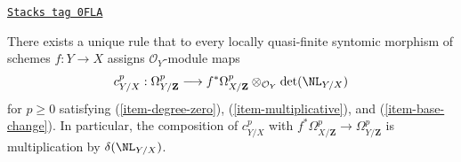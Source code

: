 \begin{lemma}
\label{derham-lemma-Garel-upstairs}
\href{https://stacks.math.columbia.edu/tag/0FLA}{\texttt{Stacks tag 0FLA}}

There exists a unique rule that to every locally quasi-finite syntomic
morphism of schemes $f : Y \to X$ assigns $\mathcal{O}_Y$-module maps
$$
c^p_{Y/X} :
\Omega^p_{Y/\mathbf{Z}}
\longrightarrow
f^*\Omega^p_{X/\mathbf{Z}} \otimes_{\mathcal{O}_Y} \det(\NL_{Y/X})
$$
for $p \geq 0$ satisfying (\ref{item-degree-zero}), (\ref{item-multiplicative}),
and (\ref{item-base-change}). In particular, the composition of
$c^p_{Y/X}$ with $f^*\Omega^p_{X/\mathbf{Z}} \to \Omega^p_{Y/\mathbf{Z}}$
is multiplication by $\delta(\NL_{Y/X})$.
\end{lemma}

